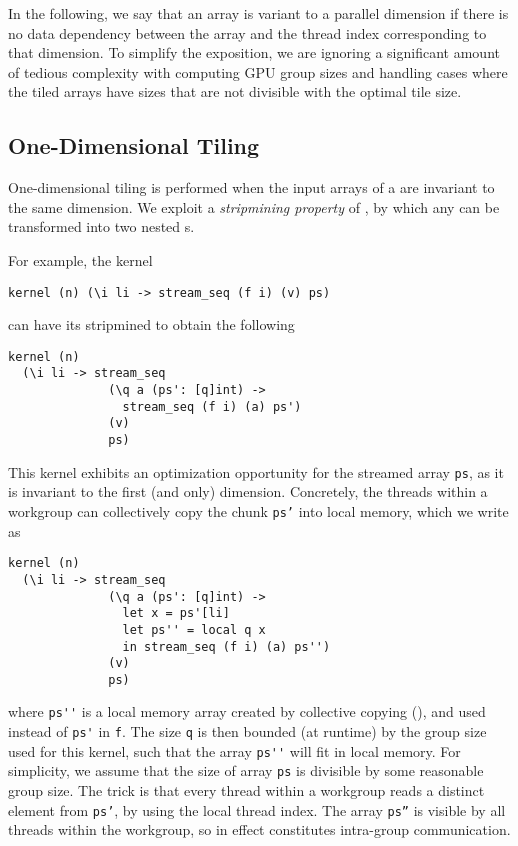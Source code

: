 In the following, we say that an array is variant to a parallel
dimension if there is no data dependency between the array and the
thread index corresponding to that dimension.  To simplify the
exposition, we are ignoring a significant amount of tedious complexity
with computing GPU group sizes and handling cases where the tiled
arrays have sizes that are not divisible with the optimal tile size.

\subsection{One-Dimensional Tiling}
\label{sec:one-dimensional-tiling}

One-dimensional tiling is performed when the input arrays of a
\StreamSeq{} are invariant to the same dimension.  We exploit a
\textit{stripmining property} of \StreamSeq{}, by which any
\StreamSeq{} can be transformed into two nested
\StreamSeq{}s.

For example, the kernel
\begin{lstlisting}
kernel (n) (\i li -> stream_seq (f i) (v) ps)
\end{lstlisting}
\noindent can have its \StreamSeq{} stripmined to obtain the following
\begin{lstlisting}
kernel (n)
  (\i li -> stream_seq
              (\q a (ps': [q]int) ->
                stream_seq (f i) (a) ps')
              (v)
              ps)
\end{lstlisting}

This kernel exhibits an optimization opportunity for the streamed
array \lstinline{ps}, as it is invariant to the first (and only)
dimension.  Concretely, the threads within a workgroup can
collectively copy the chunk \texttt{ps'} into local memory, which we
write as
\begin{lstlisting}
kernel (n)
  (\i li -> stream_seq
              (\q a (ps': [q]int) ->
                let x = ps'[li]
                let ps'' = local q x
                in stream_seq (f i) (a) ps'')
              (v)
              ps)
\end{lstlisting}
\noindent where \lstinline{ps''} is a local memory array created by
collective copying (), and used instead of \lstinline{ps'}
in \lstinline{f}. The size \lstinline{q} is then bounded (at runtime)
by the group size used for this kernel, such that the array
\lstinline{ps''} will fit in local memory.  For simplicity, we assume
that the size of array \texttt{ps} is divisible by some reasonable
group size.  The trick is that every thread within a workgroup reads a
distinct element from \texttt{ps'}, by using the local thread index.
The array \texttt{ps''} is visible by all threads within the
workgroup, so  in effect constitutes intra-group
communication.


